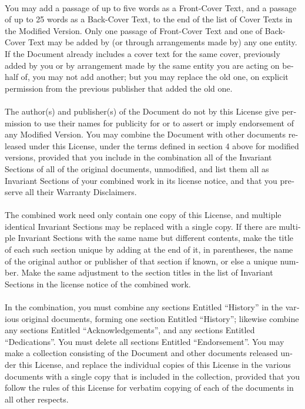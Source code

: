 \documentclass[11pt,a5paper,twoside]{book}
\begin{document}
\begin{english}
\paragraph{}You may add a passage of up to five words as a Front-Cover Text, and a
passage of up to 25 words as a Back-Cover Text, to the end of the list
of Cover Texts in the Modified Version.  Only one passage of
Front-Cover Text and one of Back-Cover Text may be added by (or
through arrangements made by) any one entity.  If the Document already
includes a cover text for the same cover, previously added by you or
by arrangement made by the same entity you are acting on behalf of,
you may not add another; but you may replace the old one, on explicit
permission from the previous publisher that added the old one.
\paragraph{}The author(s) and publisher(s) of the Document do not by this License
give permission to use their names for publicity for or to assert or
imply endorsement of any Modified Version.
You may combine the Document with other documents released under this
License, under the terms defined in section 4 above for modified
versions, provided that you include in the combination all of the
Invariant Sections of all of the original documents, unmodified, and
list them all as Invariant Sections of your combined work in its
license notice, and that you preserve all their Warranty Disclaimers.
\paragraph{}The combined work need only contain one copy of this License, and
multiple identical Invariant Sections may be replaced with a single
copy.  If there are multiple Invariant Sections with the same name but
different contents, make the title of each such section unique by
adding at the end of it, in parentheses, the name of the original
author or publisher of that section if known, or else a unique number.
Make the same adjustment to the section titles in the list of
Invariant Sections in the license notice of the combined work.
\paragraph{}In the combination, you must combine any sections Entitled “History”
in the various original documents, forming one section Entitled
“History”; likewise combine any sections Entitled “Acknowledgements”,
and any sections Entitled “Dedications”.  You must delete all sections
Entitled “Endorsement”.
You may make a collection consisting of the Document and other
documents released under this License, and replace the individual
copies of this License in the various documents with a single copy
that is included in the collection, provided that you follow the rules
of this License for verbatim copying of each of the documents in all
other respects.

\end{english}
\end{document}

